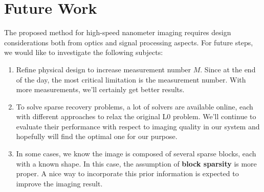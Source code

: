 \documentclass{article} %
\begin{document}
\section{Future Work}
The proposed method for high-speed nanometer imaging requires design considerations both from optics and signal processing aspects. For future steps, we would like to investigate the following subjects:
\begin{enumerate}
\item Refine physical design to increase measurement number $M$.
	Since at the end of the day, the most critical limitation is the measurement number. With more measurements, we'll certainly get better results.
\item To solve sparse recovery problems, a lot of solvers are available online, each with different approaches to relax the original L0 problem. We'll continue to evaluate their performance with respect to imaging quality in our system and hopefully will find the optimal one for our purpose.
\item In some cases, we know the image is composed of several sparse blocks, each with a known shape. In this case, the assumption of \textbf{block sparsity} is more proper. A nice way to incorporate this prior information is expected to improve the imaging result.
\end{enumerate}




%
%
%
%
%

%
%
\end{document}
